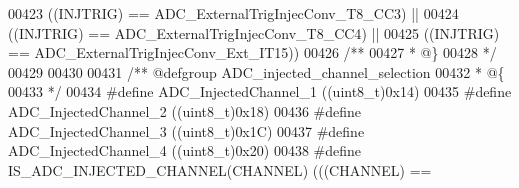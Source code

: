 \begin{DoxyCode}
00423                                         \textcolor{preprocessor}{(}\textcolor{preprocessor}{(}\textcolor{preprocessor}{INJTRIG}\textcolor{preprocessor}{)} \textcolor{preprocessor}{==} 
      ADC_ExternalTrigInjecConv_T8_CC3\textcolor{preprocessor}{)} \textcolor{preprocessor}{||}
00424                                         \textcolor{preprocessor}{(}\textcolor{preprocessor}{(}\textcolor{preprocessor}{INJTRIG}\textcolor{preprocessor}{)} \textcolor{preprocessor}{==} 
      ADC_ExternalTrigInjecConv_T8_CC4\textcolor{preprocessor}{)} \textcolor{preprocessor}{||}
00425                                         \textcolor{preprocessor}{(}\textcolor{preprocessor}{(}\textcolor{preprocessor}{INJTRIG}\textcolor{preprocessor}{)} \textcolor{preprocessor}{==} 
      ADC_ExternalTrigInjecConv_Ext_IT15\textcolor{preprocessor}{)}\textcolor{preprocessor}{)}
00426 \textcolor{comment}{/**}
00427 \textcolor{comment}{  * @\}}
00428 \textcolor{comment}{  */}
00429 
00430 
00431 \textcolor{comment}{/** @defgroup ADC\_injected\_channel\_selection }
00432 \textcolor{comment}{  * @\{}
00433 \textcolor{comment}{  */}
00434 \textcolor{preprocessor}{#}\textcolor{preprocessor}{define} \textcolor{preprocessor}{ADC\_InjectedChannel\_1}                       \textcolor{preprocessor}{(}\textcolor{preprocessor}{(}\textcolor{preprocessor}{uint8\_t}\textcolor{preprocessor}{)}0x14\textcolor{preprocessor}{)}
00435 \textcolor{preprocessor}{#}\textcolor{preprocessor}{define} \textcolor{preprocessor}{ADC\_InjectedChannel\_2}                       \textcolor{preprocessor}{(}\textcolor{preprocessor}{(}\textcolor{preprocessor}{uint8\_t}\textcolor{preprocessor}{)}0x18\textcolor{preprocessor}{)}
00436 \textcolor{preprocessor}{#}\textcolor{preprocessor}{define} \textcolor{preprocessor}{ADC\_InjectedChannel\_3}                       \textcolor{preprocessor}{(}\textcolor{preprocessor}{(}\textcolor{preprocessor}{uint8\_t}\textcolor{preprocessor}{)}0x1C\textcolor{preprocessor}{)}
00437 \textcolor{preprocessor}{#}\textcolor{preprocessor}{define} \textcolor{preprocessor}{ADC\_InjectedChannel\_4}                       \textcolor{preprocessor}{(}\textcolor{preprocessor}{(}\textcolor{preprocessor}{uint8\_t}\textcolor{preprocessor}{)}0x20\textcolor{preprocessor}{)}
00438 \textcolor{preprocessor}{#}\textcolor{preprocessor}{define} \textcolor{preprocessor}{IS\_ADC\_INJECTED\_CHANNEL}\textcolor{preprocessor}{(}\textcolor{preprocessor}{CHANNEL}\textcolor{preprocessor}{)} \textcolor{preprocessor}{(}\textcolor{preprocessor}{(}\textcolor{preprocessor}{(}\textcolor{preprocessor}{CHANNEL}\textcolor{preprocessor}{)} \textcolor{preprocessor}{==} 

\end{DoxyCode}
